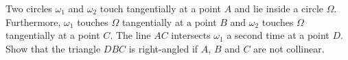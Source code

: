 Two circles $\omega_1$ and $\omega_2$ touch tangentially at a point $A$ and lie inside a circle $\Omega$.
Furthermore, $\omega_1$ touches $\Omega$ tangentially at a point $B$ and $\omega_2$ touches
$\Omega$ tangentially at a point $C$. The line $AC$ intersects $\omega_1$ a second time at a point $D$.
Show that the triangle $DBC$ is right-angled if $A$, $B$ and $C$ are not collinear.